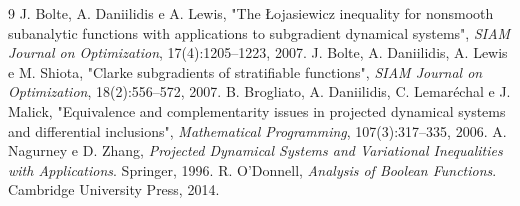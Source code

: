 \documentclass[11pt,a4paper]{article}
\begin{document}
\begin{thebibliography}{9}
 J. Bolte, A. Daniilidis e A. Lewis, "The \L{}ojasiewicz inequality for nonsmooth subanalytic functions with applications to subgradient dynamical systems", \emph{SIAM Journal on Optimization}, 17(4):1205--1223, 2007.
 J. Bolte, A. Daniilidis, A. Lewis e M. Shiota, "Clarke subgradients of stratifiable functions", \emph{SIAM Journal on Optimization}, 18(2):556--572, 2007.
 B. Brogliato, A. Daniilidis, C. Lemar\'echal e J. Malick, "Equivalence and complementarity issues in projected dynamical systems and differential inclusions", \emph{Mathematical Programming}, 107(3):317--335, 2006.
 A. Nagurney e D. Zhang, \emph{Projected Dynamical Systems and Variational Inequalities with Applications}. Springer, 1996.
 R. O'Donnell, \emph{Analysis of Boolean Functions}. Cambridge University Press, 2014.
\end{thebibliography}
\end{document}
